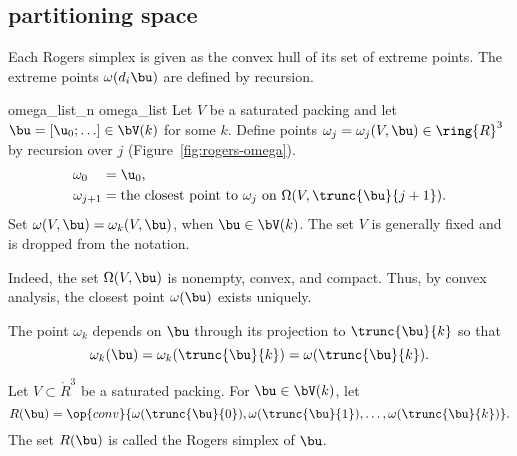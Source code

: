 \subsection{partitioning space}

Each Rogers simplex is given as the convex hull of  its set of extreme points.  
The extreme points $\omega(d_i\bu)$
are defined by recursion.

\begin{definition}[$\omega$]\label{def:omega}
   {omega\_list\_n} \formaldef{$\omega$}
  {omega\_list} Let $V$ be a saturated packing and let
  $\bu=[\u_0;\ldots]\in \bV(k)$ for some $k$.  Define points
  $\omega_j=\omega_j(V,\bu)\in\ring{R}^3$ by recursion over $j$
  (Figure~\ref{fig:rogers-omega}).
\begin{align*}
\omega_{0\phantom{+1}} &= \u_0,\\
\omega_{j+1} &=\text{the closest point to } \omega_j 
\text{ on }\Omega(V,\trunc{\bu}{j+1}).
\end{align*}
Set $\omega(V,\bu) = \omega_{k}(V,\bu)$, when $\bu\in \bV(k)$.  The
set $V$ is generally fixed and is dropped from the notation.
\end{definition}

\figHFFTUNW %

  Indeed,
the set $\Omega(V, \bu)$ is nonempty, convex, and compact.  Thus, by
convex analysis, the closest point $\omega( \bu)$ exists uniquely.

The point $\omega_k$ depends on $\bu$ through its projection to
$\trunc{\bu}{k}$ so that
\[
\omega_k(\bu) = \omega_k(\trunc{\bu}{k})=\omega(\trunc{\bu}{k}).
\]
%

\begin{definition} 
Let $V\subset\ring{R}^3$ be a saturated packing. For $\bu\in \bV(k)$, let 
\[
 R(\bu) = \op{conv}\{\omega( \trunc{\bu}{0}), \omega(
 \trunc{\bu}{1}),\ldots,\omega( \trunc{\bu}{k})\}.
\]
The set $R(\bu)$ is called the Rogers simplex of $\bu$.
%
\end{definition}

